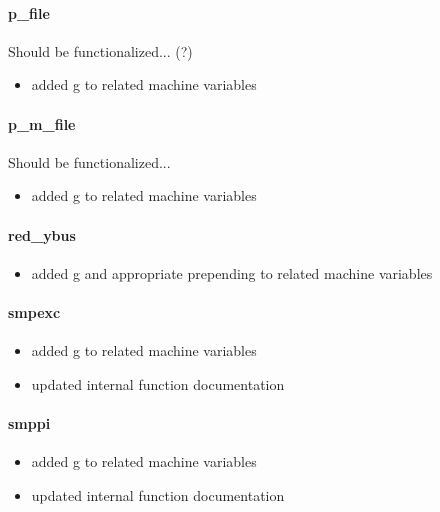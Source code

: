 \documentclass[12pt]{article}
\begin{document}
\paragraph{p\_file}
Should be functionalized... (?)
	\begin{itemize}
		\item added g to related machine variables
	\end{itemize}

\paragraph{p\_m\_file}
Should be functionalized...
	\begin{itemize}
		\item added g to related machine variables
	\end{itemize}

\paragraph{red\_ybus}
	\begin{itemize}
		\item added g  and appropriate prepending to related machine variables
	\end{itemize}

\paragraph{smpexc}
	\begin{itemize}
		\item added g to related machine variables
		\item updated internal function documentation
	\end{itemize}
\paragraph{smppi}
	\begin{itemize}
		\item added g to related machine variables
		\item updated internal function documentation
	\end{itemize}
\end{document}
